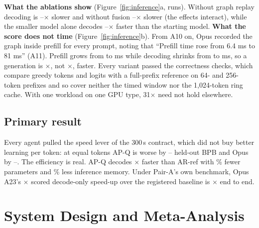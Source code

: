 \documentclass{article}
\newif\ifshowhumanmarkers \showhumanmarkersfalse
\newcommand{\humantag}[1]{{\color{humanframe}\sffamily\scriptsize\bfseries HUMAN AUTHOR MUST REWRITE/VERIFY [#1]}\ }
\newcommand{\humanauthor}[2][]{\ifshowhumanmarkers\begin{humanbox}\humantag{#1}#2\end{humanbox}\else #2\par\fi}
\begin{document}
\textbf{What the ablations show} (Figure~\ref{fig:inference}a, \CRIARuns{} runs). Without graph replay decoding is \CRIAGraphLo--\CRIAGraphHi$\times$ slower and without fusion \CRIAFusionLo--\CRIAFusionHi$\times$ slower (the effects interact), while the smaller model alone decodes \CRIAArchLo--\CRIAArchHi$\times$ faster than the starting model. \textbf{What the score does not time} (Figure~\ref{fig:inference}b). From A10 on, Opus recorded the graph inside prefill for every prompt, noting that ``Prefill time rose from 6.4 ms to 81 ms'' (A11). Prefill grows from \CRThreePreBase{} to \CRThreePreOpus{} ms while decoding shrinks from \CRThreeDecBase{} to \CRThreeDecOpus{} ms, so a generation is \CRThreeEtoEX$\times$, not \CRThreeDecX$\times$, faster. Every variant passed the correctness checks, which compare greedy tokens and logits with a full-prefix reference on 64- and 256-token prefixes and so cover neither the timed window nor the 1{,}024-token ring cache. With one workload on one GPU type, 31$\times$ need not hold elsewhere.

\subsection{Primary result}
Every agent pulled the speed lever of the 300\,s contract, which did not buy better learning per token: at equal tokens AP-Q is worse by \CREOneMatchedLoAbs--\CREOneMatchedHiAbs{} held-out BPB and Opus by \CRMTDLoAbs--\CRMTDHiAbs. The efficiency is real. AP-Q decodes \CRDecodeRatio$\times$ faster than AR-ref with \CRParamReduction\% fewer parameters and \CRMemoryReduction\% less inference memory. Under Pair-A's own benchmark, Opus A23's \CROpDecodeHi$\times$ scored decode-only speed-up over the registered baseline is \CROpEtoEHi$\times$ end to end.
\label{partoneend}

\clearpage
\section{System Design and Meta-Analysis}\label{parttwo}
\end{document}

